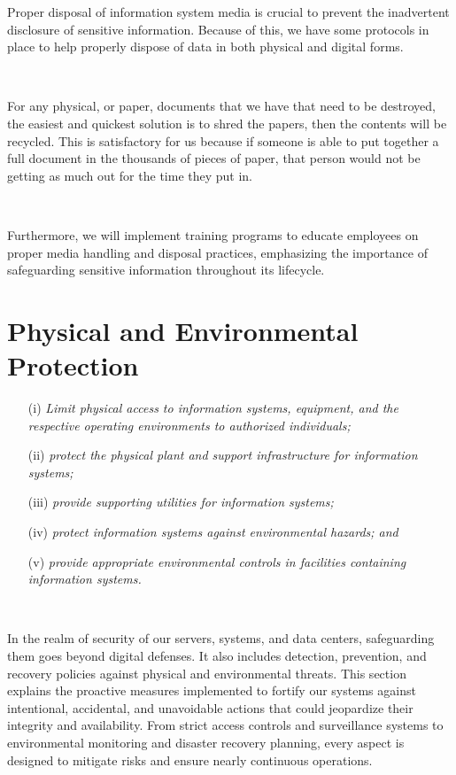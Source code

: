 \documentclass[12pt,a4paper]{report}
\begin{document}
Proper disposal of information system media is crucial to prevent the inadvertent disclosure of sensitive information. 
Because of this, we have some protocols in place to help properly dispose of data in both physical and digital forms.

\

For any physical, or paper, documents that we have that need to be destroyed, the easiest and quickest solution is to shred the papers, then the contents will be recycled.
This is satisfactory for us because if someone is able to put together a full document in the thousands of pieces of paper, that person would not be getting as much out for the time they put in.

\

Furthermore, we will implement training programs to educate employees on proper media handling and disposal practices, emphasizing the importance of safeguarding sensitive information throughout its lifecycle.

\chapter{Physical and Environmental Protection}
\begin{enumerate}
 \item[(i)]	\textit{Limit physical access to information systems, equipment, and the respective operating environments to authorized individuals;}
 \item[(ii)] \textit{protect the physical plant and support infrastructure for information systems;}
 \item[(iii)] \textit{provide supporting utilities for information systems;}
 \item[(iv)] \textit{protect information systems against environmental hazards; and}
 \item[(v)] \textit{provide appropriate environmental controls in facilities containing information systems.}
\end{enumerate}

\

In the realm of security of our servers, systems, and data centers, safeguarding them goes beyond digital defenses.
It also includes detection, prevention, and recovery policies against physical and environmental threats. 
This section explains the proactive measures implemented to fortify our systems against intentional, accidental, and unavoidable actions that could jeopardize their integrity and availability.
From strict access controls and surveillance systems to environmental monitoring and disaster recovery planning, every aspect is designed to mitigate risks and ensure nearly continuous operations.
\end{document}
